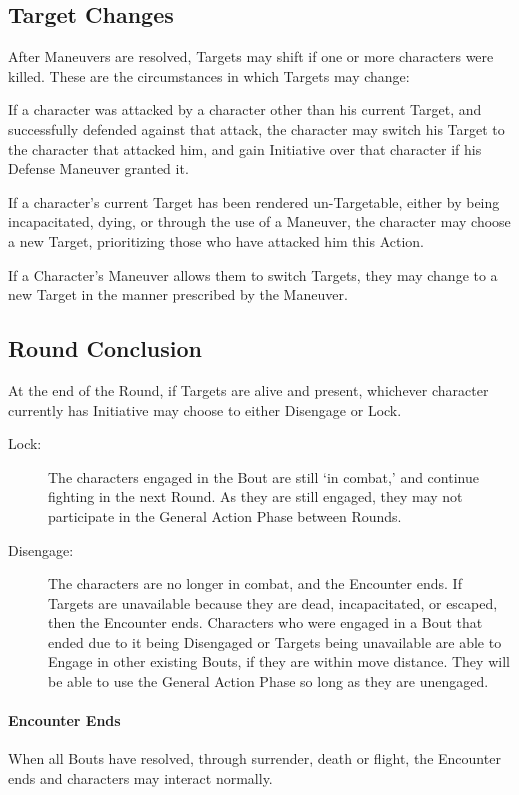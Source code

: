 \documentclass[oneside,11pt,english]{book}
\begin{document}
\subsection{Target Changes}
After Maneuvers are resolved, Targets may shift if one or more characters were killed. These are the circumstances in which Targets may change:

If a character was attacked by a character other than his current Target, and successfully defended
against that attack, the character may switch his Target to the character that attacked him, and
gain Initiative over that character if his Defense Maneuver granted it.

If a character’s current Target has been rendered un-Targetable, either by being incapacitated,
dying, or through the use of a Maneuver, the character may choose a new Target, prioritizing
those who have attacked him this Action.

If a Character’s Maneuver allows them to switch Targets, they may change to a new Target in the
manner prescribed by the Maneuver.

\subsection{Round Conclusion}
At the end of the Round, if Targets are alive and present, whichever character currently has Initiative may
choose to either Disengage or Lock.
\begin{description}
\item [Lock:] The characters engaged in the Bout are still `in combat,' and continue fighting in the next Round. As they are still engaged, they may not participate in the General Action Phase between Rounds.
\item [Disengage:] The characters are no longer in combat, and the Encounter ends.
  If Targets are unavailable because they are dead, incapacitated, or escaped, then the Encounter ends.
  Characters who were engaged in a Bout that ended due to it being Disengaged or Targets being
  unavailable are able to Engage in other existing Bouts, if they are within move distance. They will be able
  to use the General Action Phase so long as they are unengaged.
\end{description}

\paragraph{Encounter Ends}
When all Bouts have resolved, through surrender, death or flight, the Encounter ends and characters may
interact normally.
\end{document}
